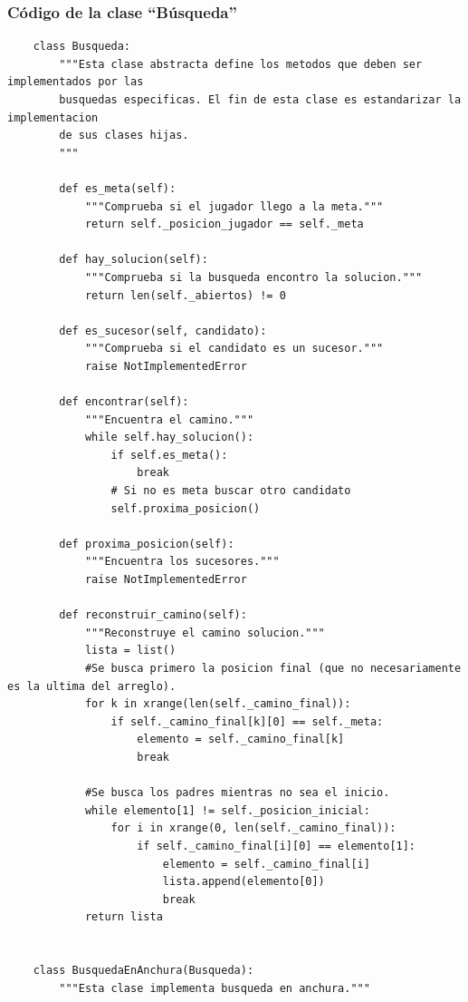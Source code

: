 \documentclass[letter, titlepage, 10pt]{article}
\begin{document}
\subsubsection{Código de la clase ``Búsqueda''}
\begin{lstlisting}
    class Busqueda:
        """Esta clase abstracta define los metodos que deben ser implementados por las 
        busquedas especificas. El fin de esta clase es estandarizar la implementacion
        de sus clases hijas.
        """
    
        def es_meta(self):
            """Comprueba si el jugador llego a la meta."""
            return self._posicion_jugador == self._meta
    
        def hay_solucion(self):
            """Comprueba si la busqueda encontro la solucion."""
            return len(self._abiertos) != 0
    
        def es_sucesor(self, candidato):
            """Comprueba si el candidato es un sucesor."""
            raise NotImplementedError
        
        def encontrar(self):
            """Encuentra el camino."""
            while self.hay_solucion():
                if self.es_meta():
                    break
                # Si no es meta buscar otro candidato
                self.proxima_posicion()
        
        def proxima_posicion(self):
            """Encuentra los sucesores."""
            raise NotImplementedError
    
        def reconstruir_camino(self):
            """Reconstruye el camino solucion."""
            lista = list()
            #Se busca primero la posicion final (que no necesariamente es la ultima del arreglo).
            for k in xrange(len(self._camino_final)):
                if self._camino_final[k][0] == self._meta:
                    elemento = self._camino_final[k]
                    break
    
            #Se busca los padres mientras no sea el inicio.
            while elemento[1] != self._posicion_inicial:
                for i in xrange(0, len(self._camino_final)):
                    if self._camino_final[i][0] == elemento[1]:
                        elemento = self._camino_final[i]
                        lista.append(elemento[0])
                        break
            return lista
    
    
    class BusquedaEnAnchura(Busqueda):
        """Esta clase implementa busqueda en anchura."""
    

\end{lstlisting}
\end{document}
